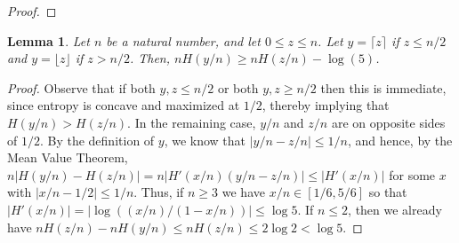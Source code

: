 \documentclass[final, 12pt]{colt2018}
\newtheorem{lemma}[theorem]{Lemma}
\theoremstyle{definition}
\theoremstyle{plain}
\begin{document}
\begin{proof}
\begin{comment}
By Lemma~\ref{lemma:entropy-rounding}
we know that %
\[ \sum_a |V_a| (H(y_a/|V_a|) - H(z_a)) \le 2^{2s} \log 5. \]
Also we have from our bound on $|d_i|$ that
\begin{align*}
\sum_i |d_i| |r'(y) c'(y) - r'(zn)c'(zn)| 
&\le \sum_i |d_i| (|r'(y)||c'(y) - c'(zn)| + |c'(zn)||r'(y) - r'(zn)|) \\
&\le \sum_i 4|d_i|n \le \frac{4\sqrt{27} s J_T}{n \sqrt{\Delta}}
\end{align*}
Similar to above we see by Lemma~\ref{lemma:gamma-def} our bound on $|d_i|$ that
\begin{align*}
\sum_i d_i|r'(y) c'(y) - r' c'| 
&\le \sum_i d_i|r'(zn) c'(zn) - r' c'| + \sum_i d_i |r'(y) c'(y) - r'(zn)c'(zn)| \\
&\le \epsilon J_T/2 + \frac{4\sqrt{27} s J_T}{n \sqrt{\Delta}}
\end{align*}
and so by \eqref{z''-below}
\begin{align*}
\log M
&\le \sum_i r'(y)_i c'(y)_i d_i + \sum_a |V_a| H(y_a/V_a) + \epsilon J_T/2 + \frac{4\sqrt{27} s J_T}{n \sqrt{\Delta}} + O(2^{2s}) \\
&\le \log Z'' + \epsilon J_T/2 + \frac{4\sqrt{27} s J_T}{n \sqrt{\Delta}} + O(2^{2s})
\end{align*}

Combining our bounds on $\log M$ we find that
\[ |\log M - \log Z''| \le \epsilon J_T/2 + \frac{4\sqrt{27} s J_T}{n \sqrt{\Delta}}| + O(2^{2s}\log n) + \lambda n. \]
Finally if $n \ge \frac{8 \sqrt{27} s}{\sqrt{\Delta} \epsilon}$ then $\frac{4\sqrt{27} s J_T}{n \sqrt{\Delta}}| \le \epsilon J_T/2$
so we get our desired result.
\end{comment}
\end{proof}
\begin{lemma}\label{lemma:entropy-rounding}
Let $n$ be a natural number, and let $0 \le z \le n$. Let $y = \lceil z \rceil$ if $z \le n/2$
and $y = \lfloor z \rfloor$ if $z > n/2$. Then,
$nH(y/n) \ge nH(z/n) - \log(5)$.
\end{lemma}
\begin{proof}
Observe that if both $y,z \le n/2$ or both $y,z \ge n/2$ then
this is immediate, since entropy is concave and maximized at $1/2$, thereby implying that $H(y/n) > H(z/n)$. In the remaining case, $y/n$ and $z/n$ are on opposite
sides of $1/2$. By the definition of $y$, we know that $|y/n - z/n| \le 1/n$, and hence, by the Mean Value Theorem, $n|H(y/n) - H(z/n)| = n|H'(x/n)(y/n - z/n)| \le |H'(x/n)|$ for some $x$ with $|x/n - 1/2| \le 1/n$.  Thus, if $n \ge 3$ we have $x/n \in [1/6,5/6]$ so that
$|H'(x/n)| = |\log((x/n)/(1 - x/n))| \le \log 5$.
If $n \le 2$, then we already have $nH(z/n) - nH(y/n) \le nH(z/n) \le 2\log2 < \log5$. 
\end{proof}
\end{document}
